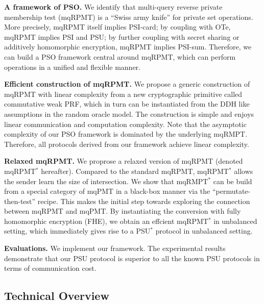 \documentclass[a4paper,10pt]{article}
\begin{document}
\begin{trivlist}
\item \textbf{A framework of PSO.} We identify that multi-query reverse private membership test (mqRPMT) 
    is a ``Swiss army knife'' for private set operations. 
    More precisely, mqRPMT itself implies PSI-card; by coupling with OTe, mqRPMT implies PSI and PSU; 
    by further coupling with secret sharing or additively homomorphic encryption, mqRPMT implies PSI-sum.  
    Therefore, we can build a PSO framework central around mqRPMT, 
    which can perform operations in a unified and flexible manner.  
    
\item \textbf{Efficient construction of mqRPMT.} We propose a generic construction of mqRPMT with linear complexity
    from a new cryptographic primitive called commutative weak PRF, 
    which in turn can be instantiated from the DDH like assumptions in the random oracle model. 
    The construction is simple and enjoys linear communication and computation complexity. 
    Note that the asymptotic complexity of our PSO framework is dominated by the underlying mqRMPT. 
    Therefore, all protocols derived from our framework achieve linear complexity. 

\item \textbf{Relaxed mqRPMT.} We proprose a relaxed version of mqRPMT (denoted mqRPMT$^*$ hereafter). 
    Compared to the standard mqRPMT, mqRPMT$^*$ allows the sender learn the size of intersection. 
    We show that mqRMPT$^*$ can be build from a special category of mqPMT in a black-box manner 
    via the ``permutate-then-test'' recipe. 
    This makes the initial step towards exploring the connection between mqRPMT and mqPMT. 
    By instantiating the conversion with fully homomorphic encryption (FHE), 
    we obtain an effcient mqRPMT$^*$ in unbalanced setting, 
    which immediately gives rise to a PSU$^*$ protocol in unbalanced setting.      

\item \textbf{Evaluations.} We implement our framework. 
    The experimental results demonstrate that our PSU protocol is superior to all the known PSU protocols 
    in terms of communication cost.   
\end{trivlist}


\subsection{Technical Overview}
\end{document}
